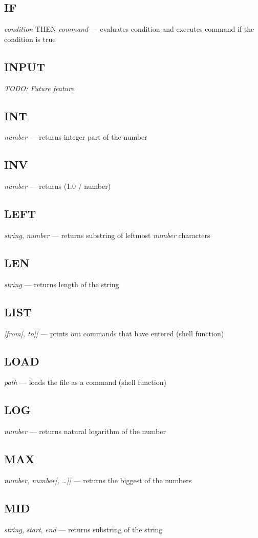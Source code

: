 \subsection{IF} \emph{condition} THEN \emph{command} --- evaluates condition and executes command if the condition is true
\subsection{INPUT} \emph{TODO: Future feature}
\subsection{INT} \emph{number} --- returns integer part of the number
\subsection{INV} \emph{number} --- returns (1.0 / number)
\subsection{LEFT} \emph{string}, \emph{number} --- returns substring of leftmost \emph{number} characters
\subsection{LEN} \emph{string} --- returns length of the string
\subsection{LIST} \emph{[from[, to]]} --- prints out commands that have entered (shell function)
\subsection{LOAD} \emph{path} --- loads the file as a command (shell function)
\subsection{LOG} \emph{number} --- returns natural logarithm of the number
\subsection{MAX} \emph{number, number[, \ldots]]} --- returns the biggest of the numbers
\subsection{MID} \emph{string}, \emph{start}, \emph{end} --- returns substring of the string

